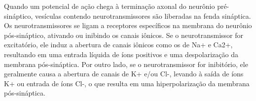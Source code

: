 Quando um potencial de ação chega à terminação axonal do neurônio pré-sináptico, vesículas contendo neurotransmissores são
liberadas na fenda sináptica. Os neurotransmissores se ligam a receptores específicos na membrana do neurônio pós-sináptico,
ativando ou inibindo os canais iônicos. Se o neurotransmissor for excitatório, ele induz a abertura de canais iônicos como os de
Na+ e Ca2+, resultando em uma entrada líquida de íons positivos e uma despolarização da membrana pós-sináptica. Por outro lado, se
o neurotransmissor for inibitório, ele geralmente causa a abertura de canais de K+ e/ou Cl-, levando à saída de íons K+ ou entrada
de íons Cl-, o que resulta em uma hiperpolarização da membrana pós-sináptica.